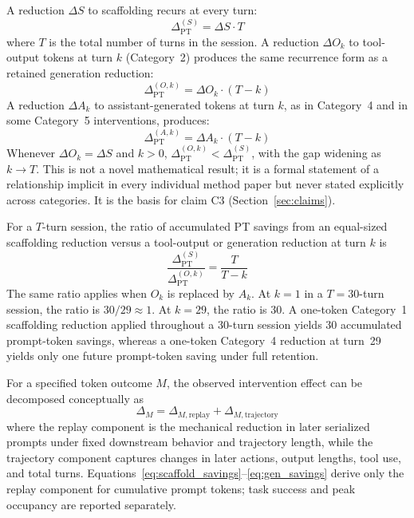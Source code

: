 \documentclass{article}
\begin{document}
A reduction $\Delta S$ to scaffolding recurs at every turn:
\begin{equation}
  \Delta_{\mathrm{PT}}^{(S)} = \Delta S \cdot T
  \label{eq:scaffold_savings}
\end{equation}
where $T$ is the total number of turns in the session. A reduction $\Delta O_k$ to tool-output tokens at turn $k$ (Category~2) produces the same recurrence form as a retained generation reduction:
\begin{equation}
  \Delta_{\mathrm{PT}}^{(O,k)} = \Delta O_k \cdot (T - k)
  \label{eq:toolout_savings}
\end{equation}
A reduction $\Delta A_k$ to assistant-generated tokens at turn $k$, as in Category~4 and in some Category~5 interventions, produces:
\begin{equation}
  \Delta_{\mathrm{PT}}^{(A,k)} = \Delta A_k \cdot (T - k)
  \label{eq:gen_savings}
\end{equation}
Whenever $\Delta O_k = \Delta S$ and $k > 0$, $\Delta_{\mathrm{PT}}^{(O,k)} < \Delta_{\mathrm{PT}}^{(S)}$, with the gap widening as $k \to T$. This is not a novel mathematical result; it is a formal statement of a relationship implicit in every individual method paper but never stated explicitly across categories. It is the basis for claim C3 (Section~\ref{sec:claims}).

For a $T$-turn session, the ratio of accumulated PT savings from an equal-sized scaffolding reduction versus a tool-output or generation reduction at turn $k$ is
\begin{equation}
  \frac{\Delta_{\mathrm{PT}}^{(S)}}{\Delta_{\mathrm{PT}}^{(O,k)}}
  = \frac{T}{T - k}
  \label{eq:recurrence_ratio}
\end{equation}
The same ratio applies when $O_k$ is replaced by $A_k$. At $k=1$ in a $T=30$-turn session, the ratio is $30/29 \approx 1$. At $k=29$, the ratio is $30$. A one-token Category~1 scaffolding reduction applied throughout a 30-turn session yields 30 accumulated prompt-token savings, whereas a one-token Category~4 reduction at turn~29 yields only one future prompt-token saving under full retention.

For a specified token outcome $M$, the observed intervention effect can be decomposed conceptually as
\begin{equation}
  \Delta_M = \Delta_{M,\mathrm{replay}} + \Delta_{M,\mathrm{trajectory}}
  \label{eq:savings_decomp}
\end{equation}
where the replay component is the mechanical reduction in later serialized prompts under fixed downstream behavior and trajectory length, while the trajectory component captures changes in later actions, output lengths, tool use, and total turns. Equations~\eqref{eq:scaffold_savings}--\eqref{eq:gen_savings} derive only the replay component for cumulative prompt tokens; task success and peak occupancy are reported separately.
\end{document}
